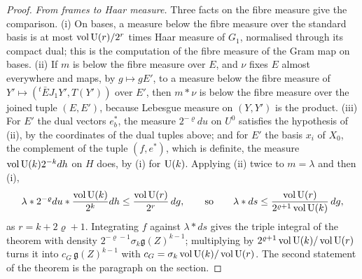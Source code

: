 \begin{proof}
\emph{From frames to Haar measure.} Three facts on the fibre measure give the comparison. (i) On bases, a measure below the fibre measure over the standard basis is at most $\operatorname{vol}\operatorname{U}(r)/2^r$ times Haar measure of $G_1$, normalised through its
compact dual; this is the computation of the fibre measure of the Gram map on bases. (ii) If $m$ is below the fibre measure over $E$, and $\nu$ fixes $E$ almost everywhere and maps, by $g\mapsto gE'$, to a measure below the fibre measure
of $Y'\mapsto({}^t\bar EJ_1Y',T(Y'))$ over $E'$, then $m*\nu$ is below the fibre measure over the joined tuple $(E,E')$, because Lebesgue measure on $(Y,Y')$ is the product. (iii) For $E'$ the dual vectors $e^*_b$, the measure
$2^{-\varrho}du$ on $U^0$ satisfies the hypothesis of (ii), by the coordinates of the dual tuples above; and for $E'$ the basis $x_i$ of $X_0$, the complement of the tuple $(f,e^*)$, which is definite, the measure $\operatorname{vol}\operatorname{U}(k)2^{-k}dh$ on $H$ does,
by (i) for $\operatorname{U}(k)$. Applying (ii) twice to $m=\lambda$ and then (i),
\[
  \lambda*2^{-\varrho}du*\frac{\operatorname{vol}\operatorname{U}(k)}{2^k}dh\le\frac{\operatorname{vol}\operatorname{U}(r)}{2^r}\,dg,\qquad\text{so}\qquad\lambda*ds\le\frac{\operatorname{vol}\operatorname{U}(r)}{2^{\varrho+1}\operatorname{vol}\operatorname{U}(k)}\,dg,
\]
as $r=k+2\varrho+1$. Integrating $f$ against $\lambda*ds$ gives the triple integral of the theorem with density $2^{-\varrho-1}\sigma_k\mathfrak g(Z)^{k-1}$; multiplying by $2^{\varrho+1}\operatorname{vol}\operatorname{U}(k)/\operatorname{vol}\operatorname{U}(r)$ turns it into $c_G\,\mathfrak g(Z)^{k-1}$ with
$c_G=\sigma_k\operatorname{vol}\operatorname{U}(k)/\operatorname{vol}\operatorname{U}(r)$. The second statement of the theorem is the paragraph on the section.
\end{proof}


